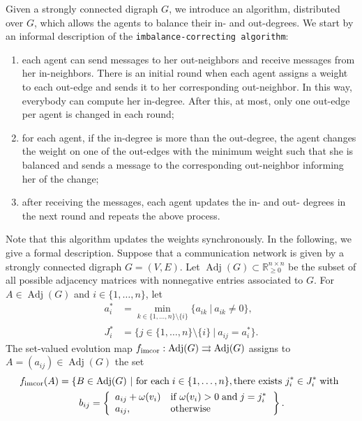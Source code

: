 \documentclass[final]{siamltex}
\begin{document}
Given a strongly connected digraph $ G $, we introduce an algorithm,
distributed over $G$, which allows the agents to balance their in- and
out-degrees. We start by an informal description of the {\texttt{imbalance-correcting algorithm}\xspace}:
\begin{enumerate}
\item each agent can send messages to her out-neighbors and receive
  messages from her in-neighbors. There is an initial round when each
  agent assigns a weight to each out-edge and sends it to her
  corresponding out-neighbor. In this way, everybody can compute her
  in-degree. After this, at most, only one out-edge per agent is
  changed in each round;

\item for each agent, if the in-degree is more than the out-degree,
  the agent changes the weight on one of the out-edges with the
  minimum weight such that she is balanced and sends a message to the
  corresponding out-neighbor informing her of the change;

\item after receiving the messages, each agent updates the in- and
  out- degrees in the next round and repeats the above process.
\end{enumerate}

Note that this algorithm updates the weights synchronously. In the
following, we give a formal description. Suppose that a communication
network is given by a strongly connected digraph $ G=(V,E)$.  Let $
{\operatorname{Adj}}(G)\subset \mathbb{R}_{\geq 0}^{n\times n} $ be the subset of all
possible adjacency matrices with nonnegative entries associated to
$G$.  For $ A \in {\operatorname{Adj}}(G)$ and $ i\in\{1,\ldots,n\} $, let
\begin{align*}
  a_i^* &= \min_{k \in \{1,\dots,n\} \setminus \{i\}}\{a_{ik}\ | \
  a_{ik}\neq 0 \},
  \\
  J_i^* &= \{j\in\{1,\ldots,n\}\setminus \{i\} \ | \ a_{ij}=a_i^*\}.
\end{align*}
The set-valued evolution map $ {{f}_{\textup{{imcor}}}}: {\operatorname{Adj}}(G )
\rightrightarrows {\operatorname{Adj}}(G) $ assigns to $A = (a_{ij}) \in {\operatorname{Adj}}(G)$ the
set
\begin{multline}\label{eq:f}
  {{f}_{\textup{{imcor}}}}(A) = \left\{ B\in {\operatorname{Adj}}(G) \ | \ \text{for each} \;
    i \in \{1,\ldots, n\}, \text{there exists } j_i^*\in J_i^* \;
    \mathrm{with} \; \right.
  \\
  \left.  b_{ij}=
    \left\{
      \begin{array}{ll}
      a_{ij}+\omega(v_i)& \text{if }  \omega(v_i)>0 \;
      \mathrm{and} \; j=j_i^*
      \\
      a_{ij}, & \mathrm{otherwise}
      
      
      \end{array}
    \right. \right\} .
\end{multline}
\end{document}
